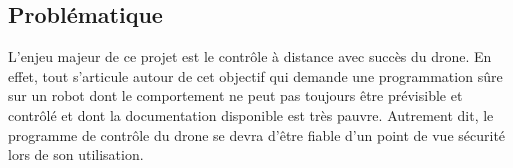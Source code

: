 \newpage
\subsection{Problématique}
L'enjeu majeur de ce projet est le contrôle à distance avec succès du drone. En effet, tout s'articule autour de cet objectif qui demande une programmation sûre sur un robot dont le comportement ne peut pas toujours être prévisible et contrôlé et dont la documentation disponible est très pauvre. Autrement dit, le programme de contrôle du drone se devra d'être fiable d'un point de vue sécurité lors de son utilisation.